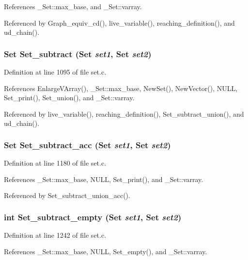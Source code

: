 References \_\-Set::max\_\-base, and \_\-Set::varray.

Referenced by Graph\_\-equiv\_\-cd(), live\_\-variable(), reaching\_\-definition(), and ud\_\-chain().
\subsubsection{\setlength{\rightskip}{0pt plus 5cm}\bf{Set} Set\_\-subtract (\bf{Set} {\em set1}, \bf{Set} {\em set2})}\label{set_8c_548b19bfc59588bf272418c9b97125f3}




Definition at line 1095 of file set.c.

References Enlarge\-VArray(), \_\-Set::max\_\-base, New\-Set(), New\-Vector(), NULL, Set\_\-print(), Set\_\-union(), and \_\-Set::varray.

Referenced by live\_\-variable(), reaching\_\-definition(), Set\_\-subtract\_\-union(), and ud\_\-chain().
\subsubsection{\setlength{\rightskip}{0pt plus 5cm}\bf{Set} Set\_\-subtract\_\-acc (\bf{Set} {\em set1}, \bf{Set} {\em set2})}\label{set_8c_926d10b8196c713ea955333bb369ccd5}




Definition at line 1180 of file set.c.

References \_\-Set::max\_\-base, NULL, Set\_\-print(), and \_\-Set::varray.

Referenced by Set\_\-subtract\_\-union\_\-acc().
\subsubsection{\setlength{\rightskip}{0pt plus 5cm}int Set\_\-subtract\_\-empty (\bf{Set} {\em set1}, \bf{Set} {\em set2})}\label{set_8c_f4fb5c3c9de989a86acef3782fe6ae78}




Definition at line 1242 of file set.c.

References \_\-Set::max\_\-base, NULL, Set\_\-empty(), and \_\-Set::varray.
